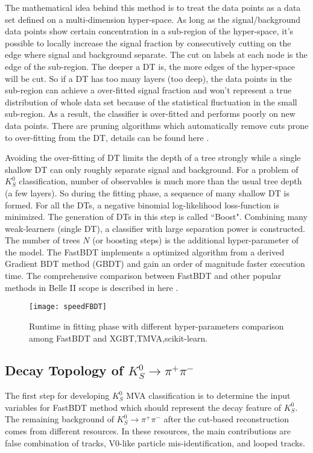 The mathematical idea behind this method is to treat the data points as a data set defined on a multi-dimension hyper-space. As long as the signal/background data points show certain concentration in a sub-region of the hyper-space, it's possible to locally increase the signal fraction by consecutively cutting on the edge where signal and background separate. The cut on labels at each node is the edge of the sub-region. The deeper a DT is, the more edges of the hyper-space will be cut. So if a DT has too many layers (too deep), the data points in the sub-region can achieve a over-fitted signal fraction and won't represent a true distribution of whole data set because of the statistical fluctuation in the small sub-region. As a result, the classifier is over-fitted and performs poorly on new data points. There are pruning algorithms which automatically remove cuts prone to over-fitting
from the DT, details can be found here \cite{olshen1984classification}.

Avoiding the over-fitting of DT limits the depth of a tree strongly while a single shallow DT can only roughly separate signal and background. For a problem of $K_S^0$ classification, number of observables is much more than the usual tree depth (a few layers). So during the fitting phase, a sequence of many shallow DT is formed. For all the DTs, a negative binomial log-likelihood loss-function is minimized. The generation of DTs in this step is called ``Boost". Combining many weak-learners (single DT), a classifier with large separation power is constructed. The number of trees $N$ (or boosting steps) is the additional hyper-parameter of the model. 
The FastBDT implements a optimized algorithm from a derived Gradient BDT method (GBDT)\cite{friedman2001greedy} and gain an order of magnitude faster execution time. The comprehensive comparison between FastBDT and other popular methods in Belle II scope is described in here \cite{keck2016fastbdt}. 

\begin{figure}[htpb]
	\centering
	\texttt{[image: speedFBDT]}
	\caption{Runtime in fitting phase with different hyper-parameters comparison among FastBDT and XGBT,TMVA,scikit-learn.\cite{keck2016fastbdt}}
\end{figure}

\subsection{Decay Topology of $K_S^0 \to \pi^+ \pi^-$}
The first step for developing $K_S^0$ MVA classification is to determine the input variables for FastBDT method which should represent the decay feature of $K_S^0$.
The remaining background of  $K_S^0 \to \pi^+ \pi^-$ after the cut-based reconstruction comes from different resources. In these resources, the main contributions are false combination of tracks, V0-like particle mis-identification, and looped tracks. 

